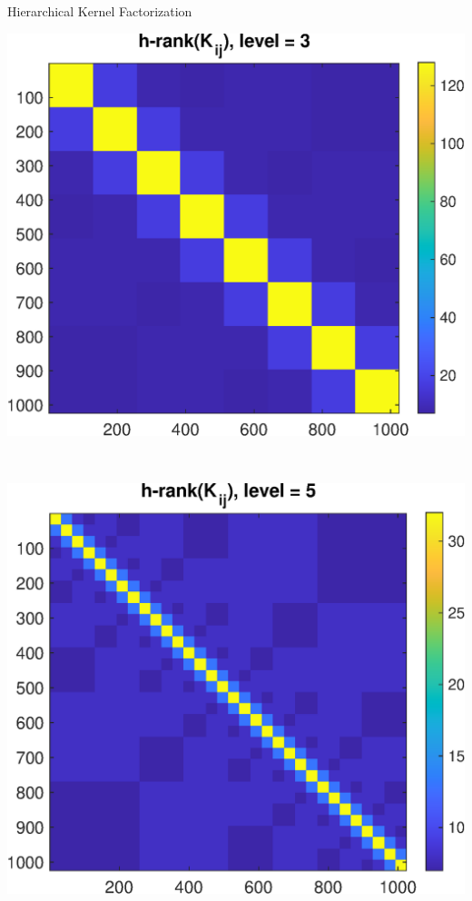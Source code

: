 \documentclass[aspectratio=169]{beamer}
\begin{document}
\begin{frame}{Hierarchical Kernel Factorization}
  \centering
  \begin{minipage}{0.45\textwidth}
    \centering
    \includegraphics[width=\linewidth]{../figures/kernel_h_rank_3.eps}
  \end{minipage}
  ~
  \begin{minipage}{0.45\textwidth}
    \centering
    \includegraphics[width=\linewidth]{../figures/kernel_h_rank_5.eps}
  \end{minipage}
\end{frame}
\end{document}
